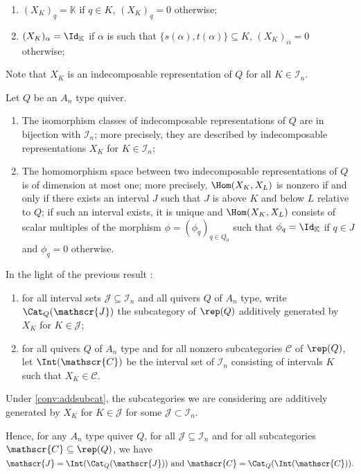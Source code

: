 	\begin{enumerate}[label = $\bullet$]
		\item $(X_K)_q = \mathbb{K}$ if $q \in K$, $(X_K)_q = 0$ otherwise;
		\item $(X_K)_{\alpha} = \Id_\mathbb{K}$ if $\alpha$ is such that $\{s(\alpha), t(\alpha)\} \subseteq K$, $(X_K)_{\alpha} = 0$ otherwise;
	\end{enumerate}
	Note that $X_K$ is an indecomposable representation of $Q$ for all $K \in \mathcal{I}_n$.
	\begin{theorem}\label{thm:indecandmorphtypeA} Let $Q$ be an $A_n$ type quiver. \begin{enumerate}[label = $(\alph*)$]
			\item \label{indectypeA} The isomorphism classes of indecomposable representations of $Q$ are in bijection with $\mathcal{I}_n$; more precisely, they are described by indecomposable representations $X_K$ for $K \in \mathcal{I}_n$;
			\item \label{morphtypeA} The homomorphism space between two indecomposable representations of $Q$ is of dimension at most one; more precisely, $\Hom(X_K, X_L)$ is nonzero if and only if  there exists an interval $J$ such that $J$ is above $K$ and below $L$ relative to $Q$; if such an interval exists, it is unique and 
			$\Hom(X_K,X_L)$ consists of scalar multiples of the morphism $\phi = (\phi_q)_{q \in Q_0}$ such that $\phi_q = \Id_\mathbb{K}$ if $q \in J$ and $\phi_q = 0$ otherwise. 
		\end{enumerate}
	\end{theorem}
	In the light of the previous result : \begin{enumerate}[label = $\bullet$]
		\item for all interval sets $\mathscr{J} \subseteq \mathcal{I}_n$ and all quivers $Q$ of $A_n$ type, write $\Cat_Q(\mathscr{J})$ the subcategory of $\rep(Q)$ additively generated by $X_K$ for $K \in \mathscr{J}$;
		\item for all quivers $Q$ of $A_n$ type and for all nonzero subcategories $\mathscr{C}$ of $\rep(Q)$, let $\Int(\mathscr{C})$ be the interval set of $\mathcal{I}_n$ consisting of intervals $K$ such that $X_K \in \mathscr{C}$.
	\end{enumerate}
	Under \cref{conv:addsubcat}, the subcategories we are considering are additively generated by $X_K$ for $K \in \mathscr{J}$ for some  $\mathscr{J} \subset \mathcal{I}_n$.
	
	Hence, for any $A_n$ type quiver $Q$, for all $\mathscr{J} \subseteq \mathcal{I}_n$ and for all subcategories $\mathscr{C} \subseteq \rep(Q)$, we have $\mathscr{J} = \Int(\Cat_Q(\mathscr{J})) \text{ and } \mathscr{C} = \Cat_Q(\Int(\mathscr{C})).$

